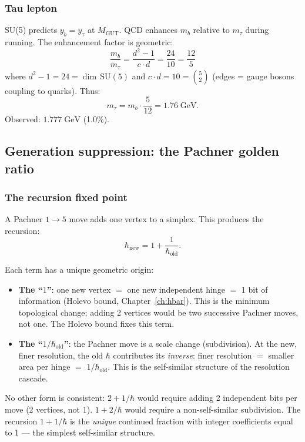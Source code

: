 \documentclass[12pt]{article}
\theoremstyle{remark}
\theoremstyle{definition}
\begin{document}
\subsubsection{Tau lepton}

SU(5) predicts $y_b = y_\tau$ at $M_\text{GUT}$. QCD enhances $m_b$ relative to $m_\tau$ during running. The enhancement factor is geometric:
\begin{equation}
\frac{m_b}{m_\tau} = \frac{d^2 - 1}{c \cdot d} = \frac{24}{10} = \frac{12}{5}
\end{equation}
where $d^2 - 1 = 24 = \dim\,\text{SU}(5)$ and $c \cdot d = 10 = \binom{5}{2}$ (edges = gauge bosons coupling to quarks). Thus:
\begin{equation}
m_\tau = m_b \cdot \frac{5}{12} = 1.76\;\text{GeV}.
\end{equation}
Observed: $1.777\;\text{GeV}$ (1.0\%).

\subsection{Generation suppression: the Pachner golden ratio}

\subsubsection{The recursion fixed point}

A Pachner $1 \to 5$ move adds one vertex to a simplex. This produces the recursion:
\begin{equation}
\hbar_\text{new} = 1 + \frac{1}{\hbar_\text{old}}.
\end{equation}

Each term has a unique geometric origin:
\begin{itemize}
\item \textbf{The ``$1$''}: one new vertex $=$ one new independent hinge $=$ 1 bit of information (Holevo bound, Chapter~\ref{ch:hbar}). This is the minimum topological change; adding 2 vertices would be two successive Pachner moves, not one. The Holevo bound fixes this term.
\item \textbf{The ``$1/\hbar_\text{old}$''}: the Pachner move is a scale change (subdivision). At the new, finer resolution, the old $\hbar$ contributes its \emph{inverse}: finer resolution $=$ smaller area per hinge $=$ $1/\hbar_\text{old}$. This is the self-similar structure of the resolution cascade.
\end{itemize}

No other form is consistent: $2 + 1/\hbar$ would require adding 2 independent bits per move (2 vertices, not 1). $1 + 2/\hbar$ would require a non-self-similar subdivision. The recursion $1 + 1/\hbar$ is the \emph{unique} continued fraction with integer coefficients equal to 1 --- the simplest self-similar structure.
\end{document}
